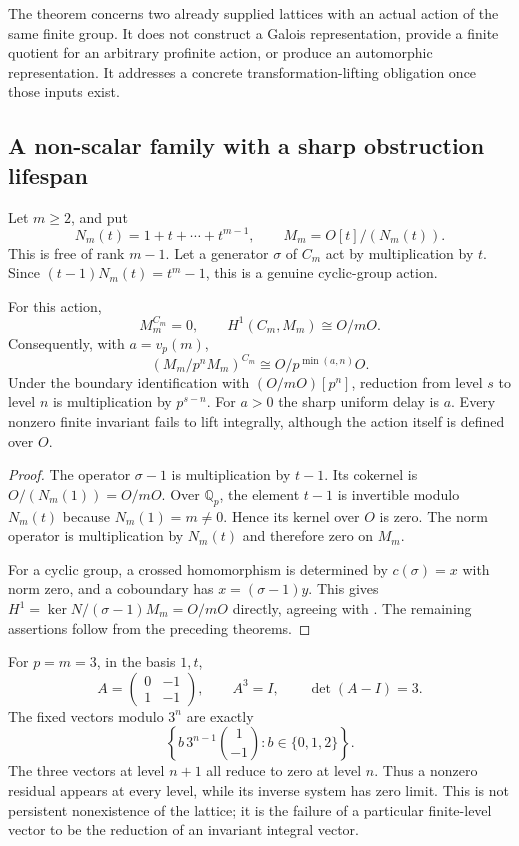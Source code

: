 The theorem concerns two already supplied lattices with an actual action of the same finite group. It does not construct a Galois representation, provide a finite quotient for an arbitrary profinite action, or produce an automorphic representation. It addresses a concrete transformation-lifting obligation once those inputs exist.

\subsection{A non-scalar family with a sharp obstruction lifespan}

Let $m\geq2$, and put
\[
 N_m(t)=1+t+\cdots+t^{m-1},\qquad
 M_m=O[t]/(N_m(t)).
\]
This is free of rank $m-1$. Let a generator $\sigma$ of $C_m$ act by multiplication by $t$. Since $(t-1)N_m(t)=t^m-1$, this is a genuine cyclic-group action.

\begin{theorem}\label{thm:norm-quotient}
For this action,
\[
 M_m^{C_m}=0,\qquad
 H^1(C_m,M_m)\cong O/mO.
\]
Consequently, with $a=v_p(m)$,
\[
 (M_m/p^nM_m)^{C_m}\cong O/p^{\min(a,n)}O.
\]
Under the boundary identification with $(O/mO)[p^n]$, reduction from level $s$ to level $n$ is multiplication by $p^{s-n}$. For $a>0$ the sharp uniform delay is $a$. Every nonzero finite invariant fails to lift integrally, although the action itself is defined over $O$.
\end{theorem}
\begin{proof}
The operator $\sigma-1$ is multiplication by $t-1$. Its cokernel is $O/(N_m(1))=O/mO$. Over $\mathbb Q_p$, the element $t-1$ is invertible modulo $N_m(t)$ because $N_m(1)=m\ne0$. Hence its kernel over $O$ is zero. The norm operator is multiplication by $N_m(t)$ and therefore zero on $M_m$.

For a cyclic group, a crossed homomorphism is determined by $c(\sigma)=x$ with norm zero, and a coboundary has $x=(\sigma-1)y$. This gives $H^1=\ker N/(\sigma-1)M_m=O/mO$ directly, agreeing with \cite[Chapter II, 1.20]{MilneCFT2020}. The remaining assertions follow from the preceding theorems.
\end{proof}

For $p=m=3$, in the basis $1,t$,
\[
 A=\begin{pmatrix}0&-1\\1&-1\end{pmatrix},\qquad
 A^3=I,\qquad \det(A-I)=3.
\]
The fixed vectors modulo $3^n$ are exactly
\[
 \left\{b\,3^{n-1}\binom{1}{-1}:b\in\{0,1,2\}\right\}.
\]
The three vectors at level $n+1$ all reduce to zero at level $n$. Thus a nonzero residual appears at every level, while its inverse system has zero limit. This is not persistent nonexistence of the lattice; it is the failure of a particular finite-level vector to be the reduction of an invariant integral vector.

